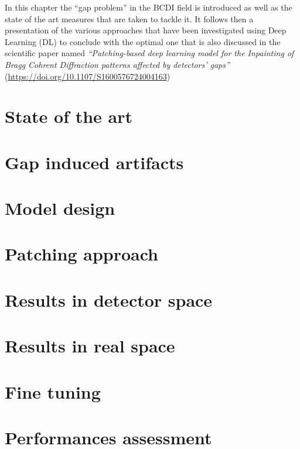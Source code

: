 
In this chapter the ``gap problem'' in the BCDI field is introduced as well as the state of the art measures that 
are taken to tackle it. It follows then a presentation of the various approaches that have been investigated using 
Deep Learning (DL) to conclude with the optimal one that is also discussed in the scientific paper named
 \textit{``Patching-based deep learning model for the Inpainting of Bragg Cohrent Diffraction patterns affected 
 by detectors' gaps''} (\url{https://doi.org/10.1107/S1600576724004163}) 

\section{State of the art}\label{chp:inpainting}
\section{Gap induced artifacts}\label{chp:phasing}
\section{Model design}\label{chp:phasing}
\section{Patching approach}\label{chp:phasing}
\section{Results in detector space}\label{chp:phasing}
\section{Results in real space}\label{chp:phasing}
\section{Fine tuning}\label{chp:phasing}
\section{Performances assessment}\label{chp:phasing}
